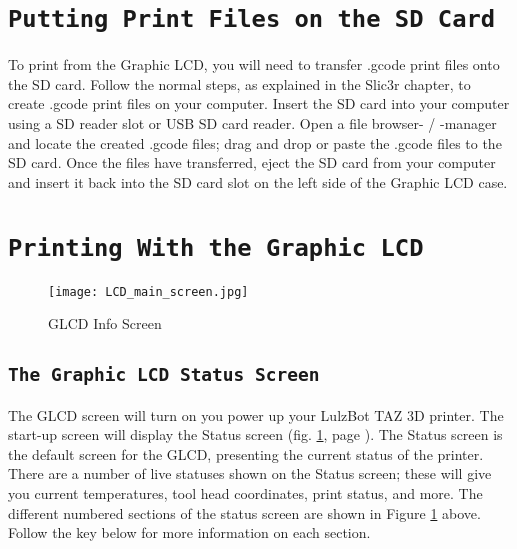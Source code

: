 \section{\texttt{Putting Print Files on the SD Card}}
To print from the Graphic LCD, you will need to transfer .gcode print files onto the SD card. Follow the normal steps, as explained in the Slic3r chapter, to create .gcode print files on your computer. Insert the SD card into your computer using a SD reader slot or USB SD card reader. Open a file browser- / -manager and locate the created .gcode files; drag and drop or paste the .gcode files to the SD card. Once the files have transferred, eject the SD card from your computer and insert it back into the SD card slot on the left side of the Graphic LCD case.

\section{\texttt{Printing With the Graphic LCD}}
\begin{figure}[b]
\centering
\texttt{[image: LCD\_main\_screen.jpg]}
\caption{GLCD Info Screen}
\label{fig:info_screen}
\end{figure}

\subsection{\texttt{The Graphic LCD Status Screen}}
The GLCD screen will turn on you power up your LulzBot\textsuperscript{\miniscule{\texttrademark}} TAZ 3D printer. The start-up screen will display the Status screen (fig. \ref{fig:info_screen}, page \pageref{fig:info_screen}). The Status screen is the default screen for the GLCD, presenting the current status of the printer. There are a number of live statuses shown on the Status screen; these will give you current temperatures, tool head coordinates, print status, and more. The different numbered sections of the status screen are shown in Figure \ref{fig:info_screen} above. Follow the key below for more information on each section.

